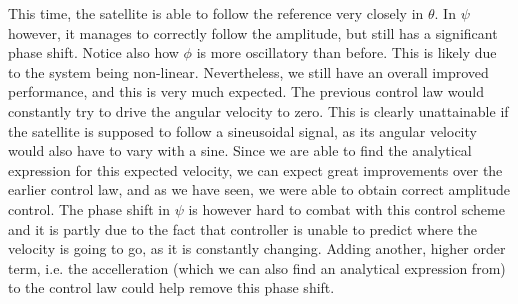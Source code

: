 This time, the satellite is able to follow the reference very closely in $\theta$. In $\psi$ however, it manages to correctly follow the amplitude, but still has a significant phase shift. Notice also how $\phi$ is more oscillatory than before. This is likely due to the system being non-linear. Nevertheless, we still have an overall improved performance, and this is very much expected. The previous control law would constantly try to drive the angular velocity to zero. This is clearly unattainable if the satellite is supposed to follow a sineusoidal signal, as its angular velocity would also have to vary with a sine. Since we are able to find the analytical expression for this expected velocity, we can expect great improvements over the earlier control law, and as we have seen, we were able to obtain correct amplitude control. The phase shift in $\psi$ is however hard to combat with this control scheme and it is partly due to the fact that controller is unable to predict where the velocity is going to go, as it is constantly changing. Adding another, higher order term, i.e. the accelleration (which we can also find an analytical expression from) to the control law could help remove this phase shift.

